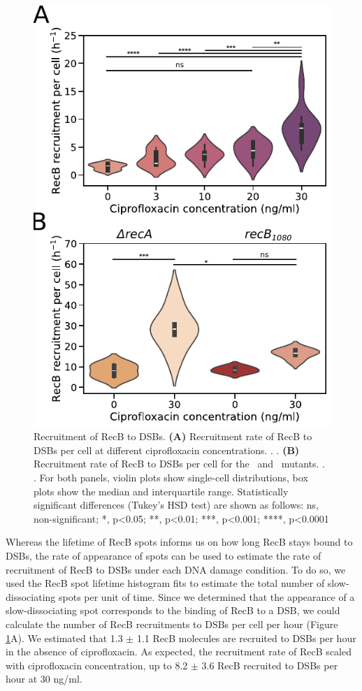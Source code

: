 \begin{figure}[htbp]
    \centering
    \includegraphics[width=.4\textwidth]{Figures/Fig3_RecB_recruitment.pdf}
    \caption{Recruitment of RecB to DSBs. \textbf{(A)} Recruitment rate of RecB to DSBs per cell at different ciprofloxacin concentrations. . . \textbf{(B)} Recruitment rate of RecB to DSBs per cell for the \dreca\ and \geneteneighty\ mutants. . . For both panels, violin plots show single-cell distributions, box plots show the median and interquartile range. Statistically significant differences (Tukey's HSD test) are shown as follows: ns, non-significant; *, p<0.05; **, p<0.01; ***, p<0.001; ****, p<0.0001}
    \label{Fig:recruitment}
\end{figure}

Whereas the lifetime of RecB spots informs us on how long RecB stays bound to DSBs, the rate of appearance of spots can be used to estimate the rate of recruitment of RecB to DSBs under each DNA damage condition. To do so, we used the RecB spot lifetime histogram fits to estimate the total number of slow-dissociating spots per unit of time. Since we determined that the appearance of a slow-dissociating spot corresponds to the binding of RecB to a DSB, we could calculate the number of RecB recruitments to DSBs per cell per hour (Figure \ref{Fig:recruitment}A). We estimated that 1.3 $\pm$ 1.1 RecB molecules are recruited to DSBs per hour in the absence of ciprofloxacin. As expected, the recruitment rate of RecB scaled with ciprofloxacin concentration, up to 8.2 $\pm$ 3.6 RecB recruited to DSBs per hour at 30 ng/ml.


